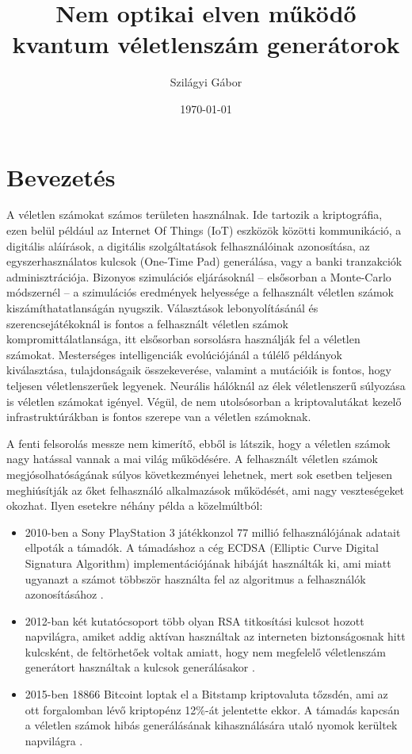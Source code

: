 \documentclass[12pt,a4paper,oneside]{article}
\title{Nem optikai elven működő \\ kvantum véletlenszám generátorok}
\author{Szilágyi Gábor}
\date{\today}
\begin{document}
\maketitle
\section*{Bevezetés}
A véletlen számokat számos területen használnak. Ide tartozik a kriptográfia, ezen belül például az Internet Of Things (IoT) eszközök közötti kommunikáció, a digitális aláírások, a digitális szolgáltatások felhasználóinak azonosítása, az egyszerhasználatos kulcsok (One-Time Pad) generálása, vagy a banki tranzakciók adminisztrációja. Bizonyos szimulációs eljárásoknál -- elsősorban a Monte-Carlo módszernél -- a szimulációs eredmények helyessége a felhasznált véletlen számok kiszámíthatatlanságán nyugszik. Választások lebonyolításánál és szerencsejátékoknál is fontos a felhasznált véletlen számok kompromittálatlansága, itt elsősorban sorsolásra használják fel a véletlen számokat. Mesterséges intelligenciák evolúciójánál a túlélő példányok kiválasztása, tulajdonságaik összekeverése, valamint a mutációik is fontos, hogy teljesen véletlenszerűek legyenek. Neurális hálóknál az élek véletlenszerű súlyozása is véletlen számokat igényel. Végül, de nem utolsósorban a kriptovalutákat kezelő infrastruktúrákban is fontos szerepe van a véletlen számoknak.
\par
A fenti felsorolás messze nem kimerítő, ebből is látszik, hogy a véletlen számok nagy hatással vannak a mai világ működésére. A felhasznált véletlen számok megjósolhatóságának súlyos következményei lehetnek, mert sok esetben teljesen meghiúsítják az őket felhasználó alkalmazások működését, ami nagy veszteségeket okozhat. Ilyen esetekre néhány példa a közelmúltból:
\begin{itemize}
	\item 2010-ben a Sony PlayStation 3 játékkonzol 77 millió felhasználójának adatait ellpoták a támadók. A támadáshoz a cég ECDSA (Elliptic Curve Digital Signatura Algorithm) implementációjának hibáját használták ki, ami miatt ugyanazt a számot többször használta fel az algoritmus a felhasználók azonosításához \cite{sony}.
	\item 2012-ban két kutatócsoport több olyan RSA titkosítási kulcsot hozott napvilágra, amiket addig aktívan használtak az interneten biztonságosnak hitt kulcsként, de feltörhetőek voltak amiatt, hogy nem megfelelő véletlenszám generátort használtak a kulcsok generálásakor \cite{bad-rsa}.
	\item 2015-ben 18866 Bitcoint loptak el a Bitstamp kriptovaluta tőzsdén, ami az ott forgalomban lévő kriptopénz 12\%-át jelentette ekkor. A támadás kapcsán a véletlen számok hibás generálásának kihasználására utaló nyomok kerültek napvilágra \cite{bitstamp}.
\end{itemize}
\end{document}
